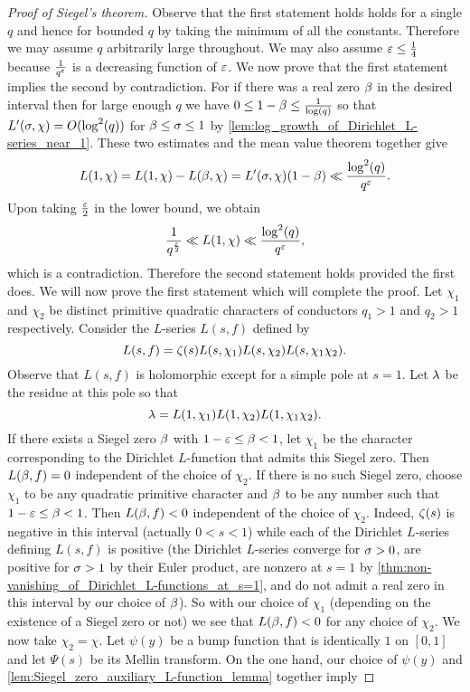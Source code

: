     \begin{proof}[Proof of Siegel's theorem]
      Observe that the first statement holds holds for a single $q$ and hence for bounded $q$ by taking the minimum of all the constants. Therefore we may assume $q$ arbitrarily large throughout. We may also assume $\varepsilon \le \frac{1}{4}$ because $\frac{1}{q^{\varepsilon}}$ is a decreasing function of $\varepsilon$. We now prove that the first statement implies the second by contradiction. For if there was a real zero $\beta$ in the desired interval then for large enough $q$ we have $0 \le 1-\beta \le \frac{1}{\log(q)}$ so that $L'(\sigma,\chi) = O(\log^{2}(q))$ for $\beta \le \sigma \le 1$ by \cref{lem:log_growth_of_Dirichlet_L-series_near_1}. These two estimates and the mean value theorem together give
      \[
        L(1,\chi) = L(1,\chi)-L(\beta,\chi) = L'(\sigma,\chi)(1-\beta) \ll \frac{\log^{2}(q)}{q^{\varepsilon}}.
      \]
      Upon taking $\frac{\varepsilon}{2}$ in the lower bound, we obtain
      \[
        \frac{1}{q^{\frac{\varepsilon}{2}}} \ll L(1,\chi) \ll \frac{\log^{2}(q)}{q^{\varepsilon}},
      \]
      which is a contradiction. Therefore the second statement holds provided the first does. We will now prove the first statement which will complete the proof. Let $\chi_{1}$ and $\chi_{2}$ be distinct primitive quadratic characters of conductors $q_{1} > 1$ and $q_{2} > 1$ respectively. Consider the $L$-series $L(s,f)$ defined by
      \[
        L(s,f) = \zeta(s)L(s,\chi_{1})L(s,\chi_{2})L(s,\chi_{1}\chi_{2}).
      \]
      Observe that $L(s,f)$ is holomorphic except for a simple pole at $s = 1$. Let $\lambda$ be the residue at this pole so that
      \[
        \lambda = L(1,\chi_{1})L(1,\chi_{2})L(1,\chi_{1}\chi_{2}).
      \]
      If there exists a Siegel zero $\beta$ with $1-\varepsilon \le \beta < 1$, let $\chi_{1}$ be the character corresponding to the Dirichlet $L$-function that admits this Siegel zero. Then $L(\beta,f) = 0$ independent of the choice of $\chi_{2}$. If there is no such Siegel zero, choose $\chi_{1}$ to be any quadratic primitive character and $\beta$ to be any number such that $1-\varepsilon \le \beta < 1$. Then $L(\beta,f) < 0$ independent of the choice of $\chi_{2}$. Indeed, $\zeta(s)$ is negative in this interval (actually $0 < s < 1$) while each of the Dirichlet $L$-series defining $L(s,f)$ is positive (the Dirichlet $L$-series converge for $\sigma > 0$, are positive for $\sigma > 1$ by their Euler product, are nonzero at $s = 1$ by \cref{thm:non-vanishing_of_Dirichlet_L-functions_at_s=1}, and do not admit a real zero in this interval by our choice of $\beta$). So with our choice of $\chi_{1}$ (depending on the existence of a Siegel zero or not) we see that $L(\beta,f) < 0$ for any choice of $\chi_{2}$. We now take $\chi_{2} = \chi$. Let $\psi(y)$ be a bump function that is identically $1$ on $[0,1]$ and let $\Psi(s)$ be its Mellin transform. On the one hand, our choice of $\psi(y)$ and \cref{lem:Siegel_zero_auxiliary_L-function_lemma} together imply

\end{proof}
